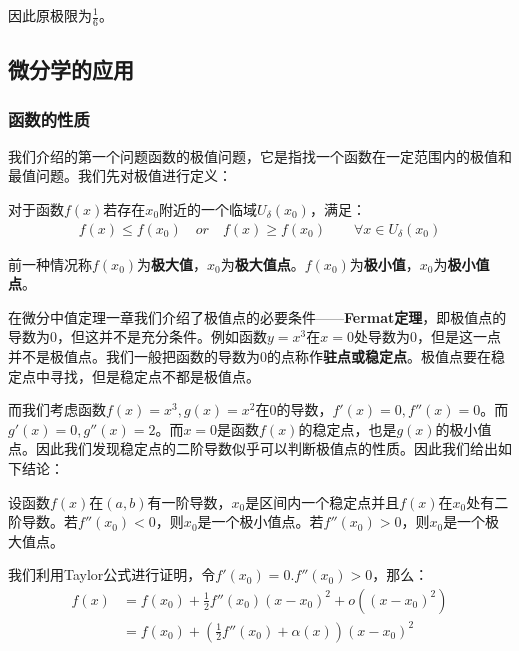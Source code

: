 \documentclass{ctexart}
\let\oldtextbf\textbf %
\renewcommand{\textbf}[1]{\textcolor{btex}{\oldtextbf{#1}}} %
\begin{document}
因此原极限为$\frac{1}{6}$。
\subsection{微分学的应用}
\subsubsection{函数的性质}
我们介绍的第一个问题函数的极值问题，它是指找一个函数在一定范围内的极值和最值问题。我们先对极值进行定义：
\begin{tcolorbox}[
    colback=bac2,     %
    colframe=fra2,   %
    coltitle=white,             %
    coltext=tex2,
    title=极值的定义,
    fonttitle=\bfseries,        %
arc=3mm,                     %
breakable
]
对于函数$f(x)$若存在$x_0$附近的一个临域$U_\delta(x_0)$，满足：
\begin{align*}
    f(x)\leq f(x_0)\quad or\quad f(x)\geq f(x_0) \qquad \forall x\in U_\delta(x_0)
\end{align*}

前一种情况称$f(x_0)$为\textbf{极大值}，$x_0$为\textbf{极大值点}。$f(x_0)$为\textbf{极小值}，$x_0$为\textbf{极小值点}。
\end{tcolorbox}

在微分中值定理一章我们介绍了极值点的必要条件——\textbf{Fermat定理}，即极值点的导数为0，但这并不是充分条件。例如函数$y=x^3$在$x=0$处导数为0，但是这一点并不是极值点。我们一般把函数的导数为0的点称作\textbf{驻点或稳定点}。极值点要在稳定点中寻找，但是稳定点不都是极值点。

而我们考虑函数$f(x)=x^3,g(x)=x^2$在0的导数，$f'(x)=0,f''(x)=0$。而$g'(x)=0,g''(x)=2$。而$x=0$是函数$f(x)$的稳定点，也是$g(x)$的极小值点。因此我们发现稳定点的二阶导数似乎可以判断极值点的性质。因此我们给出如下结论：
\begin{tcolorbox}[
    colback=bac1,     %
    colframe=fra1,   %
    coltitle=white,             %
    coltext=tex1,
    title=极值点的判定,
    fonttitle=\bfseries,        %
arc=3mm,                     %
breakable
]
设函数$f(x)$在$(a,b)$有一阶导数，$x_0$是区间内一个稳定点并且$f(x)$在$x_0$处有二阶导数。若$f''(x_0)<0$，则$x_0$是一个极小值点。若$f''(x_0)>0$，则$x_0$是一个极大值点。
\end{tcolorbox}

我们利用Taylor公式进行证明，令$f'(x_0)=0.f''(x_0)>0$，那么：
\begin{align*}
    f(x)&=f(x_0)+\frac{1}{2}f''(x_0)(x-x_0)^2+o((x-x_0)^2)\\
    &=f(x_0)+(\frac{1}{2}f''(x_0)+\alpha(x))(x-x_0)^2
\end{align*}
\end{document}
